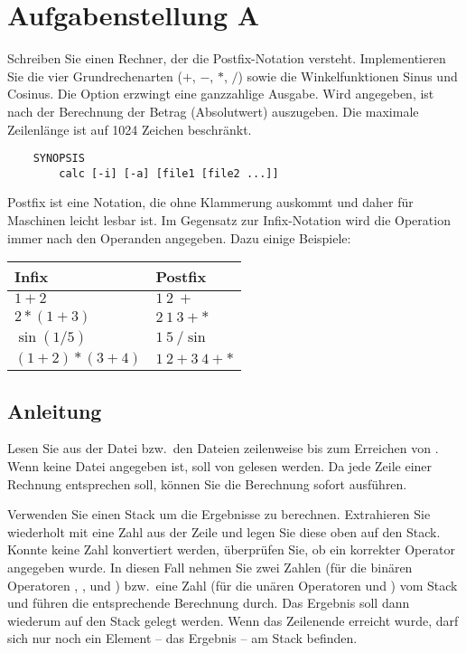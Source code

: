 




\section*{Aufgabenstellung A}
Schreiben Sie einen Rechner, der die Postfix-Notation versteht.
Implementieren Sie die vier Grundrechenarten (\(+\), \(-\), \(*\), \(/\)) sowie
die Winkelfunktionen Sinus und Cosinus. Die Option  erzwingt eine
ganzzahlige Ausgabe. Wird  angegeben, ist nach der Berechnung der
Betrag (Absolutwert) auszugeben. Die maximale Zeilenlänge ist auf 1024 Zeichen
beschränkt.

\begin{verbatim}
    SYNOPSIS
        calc [-i] [-a] [file1 [file2 ...]]
\end{verbatim}

Postfix ist eine Notation, die ohne Klammerung auskommt und daher für Maschinen
leicht lesbar ist. Im Gegensatz zur Infix-Notation wird die Operation immer nach
den Operanden angegeben. Dazu einige Beispiele:

\begin{tabular}{ll}
\toprule
Infix           & Postfix \\
\midrule
\(1+2\)         & \(1 \: 2 \: +\) \\
\(2*(1+3)\)     & \(2 \: 1 \: 3 + *\) \\
\(\sin(1/5)\)   & \(1 \: 5 \: / \sin\) \\
\((1+2)*(3+4)\) & \(1\:2 + 3\:4 + *\) \\
\bottomrule
\end{tabular}

\subsection*{Anleitung}
Lesen Sie aus der Datei bzw.\ den Dateien zeilenweise bis zum Erreichen von
. Wenn keine Datei angegeben ist, soll von 
gelesen werden. Da jede Zeile einer Rechnung entsprechen soll, können Sie die
Berechnung sofort ausführen.

Verwenden Sie einen Stack um die Ergebnisse zu berechnen. Extrahieren Sie
wiederholt mit  eine Zahl aus der Zeile und legen Sie
diese oben auf den Stack. Konnte keine Zahl konvertiert werden, überprüfen Sie,
ob ein korrekter Operator angegeben wurde. In diesen Fall nehmen Sie zwei Zahlen
(für die binären Operatoren \osueinput{+}, \osueinput{-}, \osueinput{/} und
\osueinput{*}) bzw.\ eine Zahl (für die unären Operatoren  und
) vom Stack und führen die entsprechende Berechnung durch. Das
Ergebnis soll dann wiederum auf den Stack gelegt werden.
Wenn das Zeilenende erreicht wurde, darf sich nur noch ein Element -- das
Ergebnis -- am Stack befinden.

